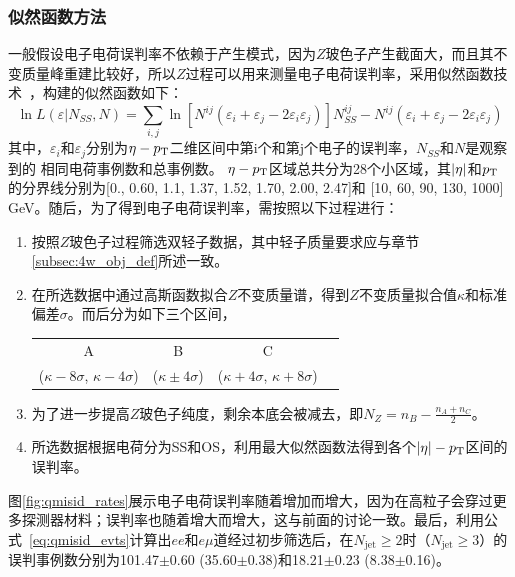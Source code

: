 \subsubsection{似然函数方法}
一般假设电子电荷误判率不依赖于产生模式，因为$Z$玻色子产生截面大，而且其不变质量峰重建比较好，所以$Z$过程可以用来测量电子电荷误判率，采用似然函数技术~\cite{Likelihoodnote}，构建的似然函数如下：
\begin{equation}
\ln L(\varepsilon|N_{SS},N)=\sum_{i,j}\ln [N^{ij}(\varepsilon_i+\varepsilon_j-2\varepsilon_i \varepsilon_j)]N^{ij}_{SS}-N^{ij}(\varepsilon_i+\varepsilon_j-2\varepsilon_i \varepsilon_j)
\end{equation}
其中，$\varepsilon_i$和$\varepsilon_j$分别为$\eta-p_{\text{T}}$二维区间中第i个和第j个电子的误判率，$N_{SS}$和$N$是观察到的
相同电荷事例数和总事例数。
$\eta-p_{\text{T}}$区域总共分为28个小区域，其$|\eta|$和$p_{\text{T}}$的分界线分别为[0., 0.60, 1.1, 1.37, 1.52, 1.70, 2.00, 2.47]和
[10, 60, 90, 130, 1000] GeV。随后，为了得到电子电荷误判率，需按照以下过程进行：
\begin{enumerate}
 \item 按照$Z$玻色子过程筛选双轻子数据，其中轻子质量要求应与章节\ref{subsec:4w_obj_def}所述一致。
 \item 在所选数据中通过高斯函数拟合$Z$不变质量谱，得到$Z$不变质量拟合值$\kappa$和标准偏差$\sigma$。而后分为如下三个区间，
\begin{table}[h]
\centering
\begin{tabular}{cccc}
\hline
  A  &B  &C  \\
($\kappa-8\sigma$, $\kappa - 4\sigma$)  & ($\kappa \pm 4\sigma$)  & ($\kappa+4\sigma$, $\kappa + 8\sigma$) \\
\hline
\end{tabular}
\end{table}

 \item 为了进一步提高$Z$玻色子纯度，剩余本底会被减去，即$N_Z=n_B-\frac{n_A+n_C}{2}$。
 \item 所选数据根据电荷分为SS和OS，利用最大似然函数法得到各个$|\eta|-p_{\text{T}}$区间的误判率。
\end{enumerate}
图\ref{fig:qmisid_rates}展示电子电荷误判率随着\abseta 增加而增大，因为在高\abseta 粒子会穿过更多探测器材料；误判率也随着\pt 增大而增大，这与前面的讨论一致。最后，利用公式~\ref{eq:qmisid_evts}计算出$ee$和$e\mu$道经过初步筛选后，在$N_{\text{jet}}\ge2$时（$N_{\text{jet}}\ge3$）的误判事例数分别为101.47$\pm$0.60 (35.60$\pm$0.38)和18.21$\pm$0.23 (8.38$\pm$0.16)。
